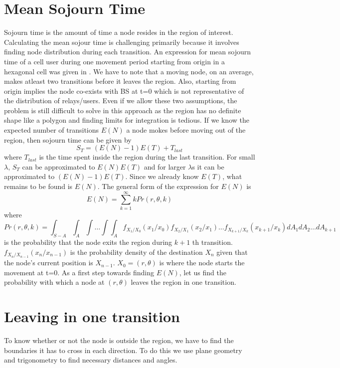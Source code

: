 \section{Mean Sojourn Time}
Sojourn time is the amount of time a node resides in the region of interest. Calculating the mean sojour time is challenging primarily because it involves finding node distribution during each transition. An expression for  mean sojourn time of a cell user during one movement period starting from origin in a hexagonal cell was given in \cite{lin}. We have to note that
a moving node, on an average, makes atleast two transitions before it leaves
the region. Also, starting from origin implies the node co-exists with BS at
t=0 which is not representative of the distribution of relays/users. Even if we
allow these two assumptions, the problem is still difficult to solve in this
approach as the region has no definite shape like a polygon and finding limits
for integration is tedious. 
	If we know the expected number of transitions $E(N)$ a node mokes before moving out of the
region, then sojourn time can be given by
\begin{equation*}
	S_T = (E(N)-1)E(T) + T_{last}
\end{equation*}
where $T_{last}$ is the time spent inside the region during the last transition. For small $\lambda$, $S_T$ can be approximated to $E(N)E(T)$ and for larger $\lambda$s it can be approximated to $(E(N)-1)E(T)$. Since we already know $E(T)$, what remains to be found is $E(N)$. The 
general form of the expression for $E(N)$ is
\begin{equation*}
	E(N) = \sum_{k=1}^{\infty} k Pr(r,\theta,k)
\end{equation*}
where 
\begin{equation*}
	Pr(r,\theta,k) = \int_{S-A} \int_A \int \ldots \int \int_A f_{X_1/X_0}(x_1/x_0)f_{X_2/X_1}(x_2/x_1)\ldots f_{X_{k+1}/X_{k}}(x_{k+1}/x_{k}) dA_1 dA_2\ldots dA_{k+1}
\end{equation*} is the probability that the node exits the region during $k+1$ th transition. 
$f_{X_n/X_{n-1}}(x_n/x_{n-1})$ is the probability density of the destination $X_n$ given that
the node's current position is $X_{n-1}$. $X_0 = (r,\theta)$ is where the node starts the  movement at t=0. 
As a first step towards finding $E(N)$, let us find the probability with which a node at $(r,\theta)$ leaves the region in one transition.

\section{Leaving in  one transition}
To know whether or not the node is outside the region, we have to find the boundaries it has to cross in each direction. To do this we use plane geometry and trigonometry to find necessary distances and angles.
